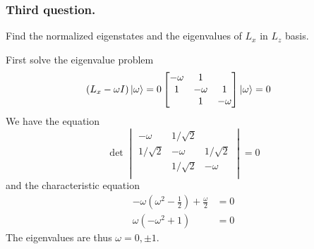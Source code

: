 \documentclass[../../../main.tex]{subfiles}
\begin{document}
\subsubsection{Third question.}
Find the normalized eigenstates and the eigenvalues of $L_x$ in $L_z$ basis.

First solve the eigenvalue problem
\begin{align*}
    \left( L_x-\omega I  \right) \ket{\omega} & = 0
    \begin{bmatrix}
        -\omega & 1       &         \\
        1       & -\omega & 1       \\
                & 1       & -\omega \\
    \end{bmatrix}
    \ket{\omega}=0
\end{align*}
We have the equation
\begin{equation*}
    \det
    \begin{vmatrix}
        -\omega    & 1/\sqrt{2 } &            \\
        1/\sqrt{2} & -\omega     & 1/\sqrt{2} \\
                   & 1/\sqrt{2}  & -\omega    \\
    \end{vmatrix}
    =0
\end{equation*}
and the characteristic equation
\begin{align*}
    -\omega \left( \omega^2- \frac{1 }{2} \right) +\frac{\omega }{2} & = 0 \\
    \omega \left( -\omega^2+1  \right)                               & = 0
\end{align*}
The eigenvalues are thus $\omega=0,\pm 1$.
\end{document}
